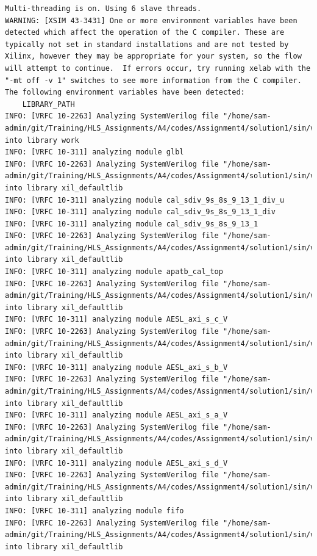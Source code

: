 \documentclass{article}
\begin{document}
\begin{lstlisting}
Multi-threading is on. Using 6 slave threads.
WARNING: [XSIM 43-3431] One or more environment variables have been detected which affect the operation of the C compiler. These are typically not set in standard installations and are not tested by Xilinx, however they may be appropriate for your system, so the flow will attempt to continue.  If errors occur, try running xelab with the "-mt off -v 1" switches to see more information from the C compiler. The following environment variables have been detected:
    LIBRARY_PATH
INFO: [VRFC 10-2263] Analyzing SystemVerilog file "/home/sam-admin/git/Training/HLS_Assignments/A4/codes/Assignment4/solution1/sim/verilog/glbl.v" into library work
INFO: [VRFC 10-311] analyzing module glbl
INFO: [VRFC 10-2263] Analyzing SystemVerilog file "/home/sam-admin/git/Training/HLS_Assignments/A4/codes/Assignment4/solution1/sim/verilog/cal_sdiv_9s_8s_9_13_1.v" into library xil_defaultlib
INFO: [VRFC 10-311] analyzing module cal_sdiv_9s_8s_9_13_1_div_u
INFO: [VRFC 10-311] analyzing module cal_sdiv_9s_8s_9_13_1_div
INFO: [VRFC 10-311] analyzing module cal_sdiv_9s_8s_9_13_1
INFO: [VRFC 10-2263] Analyzing SystemVerilog file "/home/sam-admin/git/Training/HLS_Assignments/A4/codes/Assignment4/solution1/sim/verilog/cal.autotb.v" into library xil_defaultlib
INFO: [VRFC 10-311] analyzing module apatb_cal_top
INFO: [VRFC 10-2263] Analyzing SystemVerilog file "/home/sam-admin/git/Training/HLS_Assignments/A4/codes/Assignment4/solution1/sim/verilog/AESL_axi_s_c_V.v" into library xil_defaultlib
INFO: [VRFC 10-311] analyzing module AESL_axi_s_c_V
INFO: [VRFC 10-2263] Analyzing SystemVerilog file "/home/sam-admin/git/Training/HLS_Assignments/A4/codes/Assignment4/solution1/sim/verilog/AESL_axi_s_b_V.v" into library xil_defaultlib
INFO: [VRFC 10-311] analyzing module AESL_axi_s_b_V
INFO: [VRFC 10-2263] Analyzing SystemVerilog file "/home/sam-admin/git/Training/HLS_Assignments/A4/codes/Assignment4/solution1/sim/verilog/AESL_axi_s_a_V.v" into library xil_defaultlib
INFO: [VRFC 10-311] analyzing module AESL_axi_s_a_V
INFO: [VRFC 10-2263] Analyzing SystemVerilog file "/home/sam-admin/git/Training/HLS_Assignments/A4/codes/Assignment4/solution1/sim/verilog/AESL_axi_s_d_V.v" into library xil_defaultlib
INFO: [VRFC 10-311] analyzing module AESL_axi_s_d_V
INFO: [VRFC 10-2263] Analyzing SystemVerilog file "/home/sam-admin/git/Training/HLS_Assignments/A4/codes/Assignment4/solution1/sim/verilog/AESL_fifo.v" into library xil_defaultlib
INFO: [VRFC 10-311] analyzing module fifo
INFO: [VRFC 10-2263] Analyzing SystemVerilog file "/home/sam-admin/git/Training/HLS_Assignments/A4/codes/Assignment4/solution1/sim/verilog/cal.v" into library xil_defaultlib

\end{lstlisting}
\end{document}
